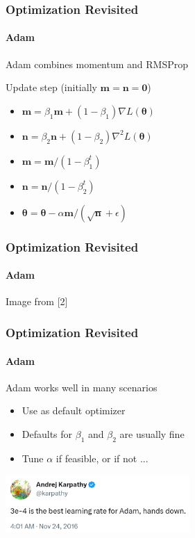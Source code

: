 \documentclass[xetex,professionalfont]{beamer}
\renewcommand\emph[1]{\textcolor{tuwcvl_cvl_blue}{#1}}
\renewcommand{\vec}[1]{\ensuremath{\mathbf{#1}}}
\newcommand{\vm}{\vec{m}}
\newcommand{\vn}{\vec{n}}
\newcommand{\bth}{\boldsymbol{\theta}}
\begin{document}
\begin{frame}
\frametitle{Optimization Revisited}
\framesubtitle{Adam}

\emph{Adam} combines momentum and RMSProp

\bigskip


Update step (initially $\vm=\vn=\vec{0}$)
\begin{itemize}
    \item $\vm=\beta_1\vm+(1-\beta_1)\nabla L(\bth)$ %
    \item $\vn=\beta_2\vn+(1-\beta_2)\nabla^2 L(\bth)$ %
    \item $\vm=\vm/(1-\beta_1^t)$ %
    \item $\vn=\vn/(1-\beta_2^t)$ %
    \item $\bth=\bth-\alpha\vm/(\sqrt{\vn}+\epsilon)$ %
\end{itemize}

\end{frame}


\begin{frame}
  \frametitle{Optimization Revisited}
  \framesubtitle{Adam}
  
  \begin{center}
  {\centering Image from [2]}
  \end{center}
  
  \end{frame}


\begin{frame}
\frametitle{Optimization Revisited}
\framesubtitle{Adam}

Adam works well in many scenarios
\begin{itemize}
    \item Use as default optimizer
    \item Defaults for $\beta_1$ and $\beta_2$ are usually fine
    \item Tune $\alpha$ if feasible, or if not ... \smiley{} 
\end{itemize}

\medskip

\begin{center}
 \includegraphics[width=7cm]{images/adam-andrej}
\end{center}

\end{frame}
\end{document}

